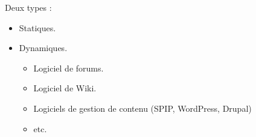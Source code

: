 \begin{frame}
	Deux types : %
	\begin{itemize}
		\item Statiques.
		\item Dynamiques.
		\begin{itemize}
			\item Logiciel de forums.
			\item Logiciel de Wiki.
			\item Logiciels de gestion de contenu (SPIP, WordPress, Drupal)
			\item etc. %
		\end{itemize} 
	\end{itemize}
\end{frame}
